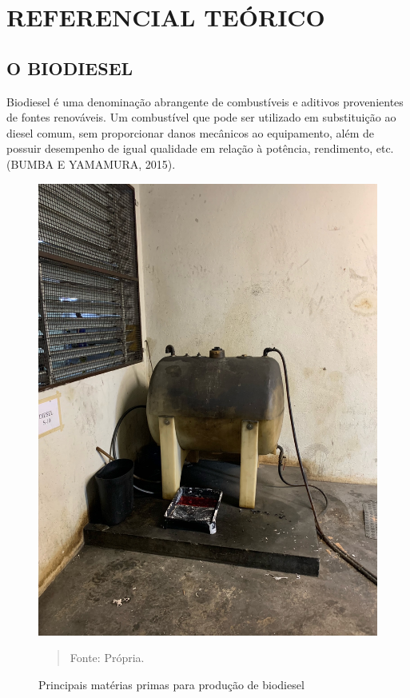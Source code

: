 \section{REFERENCIAL TEÓRICO}	

\subsection{O BIODIESEL}
\hspace*{0.8cm}Biodiesel é uma denominação abrangente de combustíveis e aditivos provenientes de fontes renováveis. Um combustível que pode ser utilizado em substituição ao diesel comum, sem proporcionar danos mecânicos ao equipamento, além de possuir desempenho de igual qualidade em relação à potência, rendimento, etc. (BUMBA E YAMAMURA, 2015).

\begin{figure}[!htb]
\begin{center}
			\caption{Principais matérias primas para produção de biodiesel}
			\includegraphics[width=.9\textwidth]{Figuras/image0.jpeg}
            \vspace*{\fill} 
            \begin{quote} 
            \centering 
            Fonte: Própria.
            \end{quote}
            \vspace*{\fill}
			\label{fig:ramcor}
\end{center}
\end{figure}

